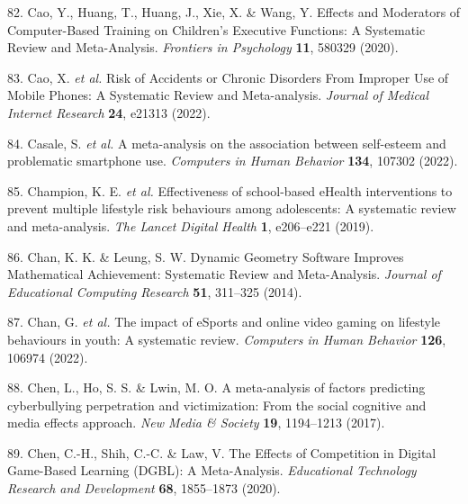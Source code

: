 \documentclass[
  english,
  man]{apa6}
\newenvironment{cslreferences}%
  {}%
  {\par}
\begin{document}
\begin{cslreferences}
\leavevmode\hypertarget{ref-caoEffectsModeratorsComputerBased2020}{}%
82. Cao, Y., Huang, T., Huang, J., Xie, X. \& Wang, Y. Effects and Moderators of Computer-Based Training on Children's Executive Functions: A Systematic Review and Meta-Analysis. \emph{Frontiers in Psychology} \textbf{11}, 580329 (2020).

\leavevmode\hypertarget{ref-caoRiskAccidentsChronic2022}{}%
83. Cao, X. \emph{et al.} Risk of Accidents or Chronic Disorders From Improper Use of Mobile Phones: A Systematic Review and Meta-analysis. \emph{Journal of Medical Internet Research} \textbf{24}, e21313 (2022).

\leavevmode\hypertarget{ref-casaleMetaanalysisAssociationSelfesteem2022}{}%
84. Casale, S. \emph{et al.} A meta-analysis on the association between self-esteem and problematic smartphone use. \emph{Computers in Human Behavior} \textbf{134}, 107302 (2022).

\leavevmode\hypertarget{ref-championEffectivenessSchoolbasedEHealth2019}{}%
85. Champion, K. E. \emph{et al.} Effectiveness of school-based eHealth interventions to prevent multiple lifestyle risk behaviours among adolescents: A systematic review and meta-analysis. \emph{The Lancet Digital Health} \textbf{1}, e206--e221 (2019).

\leavevmode\hypertarget{ref-chanDynamicGeometrySoftware2014}{}%
86. Chan, K. K. \& Leung, S. W. Dynamic Geometry Software Improves Mathematical Achievement: Systematic Review and Meta-Analysis. \emph{Journal of Educational Computing Research} \textbf{51}, 311--325 (2014).

\leavevmode\hypertarget{ref-chanImpactESportsOnline2022}{}%
87. Chan, G. \emph{et al.} The impact of eSports and online video gaming on lifestyle behaviours in youth: A systematic review. \emph{Computers in Human Behavior} \textbf{126}, 106974 (2022).

\leavevmode\hypertarget{ref-chenMetaanalysisFactorsPredicting2017}{}%
88. Chen, L., Ho, S. S. \& Lwin, M. O. A meta-analysis of factors predicting cyberbullying perpetration and victimization: From the social cognitive and media effects approach. \emph{New Media \& Society} \textbf{19}, 1194--1213 (2017).

\leavevmode\hypertarget{ref-chenEffectsCompetitionDigital2020}{}%
89. Chen, C.-H., Shih, C.-C. \& Law, V. The Effects of Competition in Digital Game-Based Learning (DGBL): A Meta-Analysis. \emph{Educational Technology Research and Development} \textbf{68}, 1855--1873 (2020).


\end{cslreferences}
\end{document}
